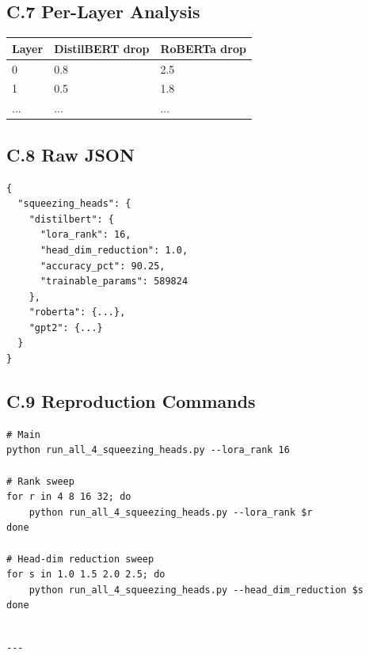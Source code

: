 \subsection{C.7 Per-Layer Analysis}

\begin{table}[H]
\centering
\small
\begin{tabular}{lll}
\toprule
\textbf{Layer} & \textbf{DistilBERT drop} & \textbf{RoBERTa drop} \\
\midrule
0 & 0.8 & 2.5 \\
1 & 0.5 & 1.8 \\
... & ... & ... \\
\bottomrule
\end{tabular}
\end{table}

\subsection{C.8 Raw JSON}

\begin{lstlisting}
{
  "squeezing_heads": {
    "distilbert": {
      "lora_rank": 16,
      "head_dim_reduction": 1.0,
      "accuracy_pct": 90.25,
      "trainable_params": 589824
    },
    "roberta": {...},
    "gpt2": {...}
  }
}
\end{lstlisting}

\subsection{C.9 Reproduction Commands}

\begin{lstlisting}
# Main
python run_all_4_squeezing_heads.py --lora_rank 16

# Rank sweep
for r in 4 8 16 32; do
    python run_all_4_squeezing_heads.py --lora_rank $r
done

# Head-dim reduction sweep
for s in 1.0 1.5 2.0 2.5; do
    python run_all_4_squeezing_heads.py --head_dim_reduction $s
done
\end{lstlisting}
\begin{lstlisting}

---
\end{lstlisting}